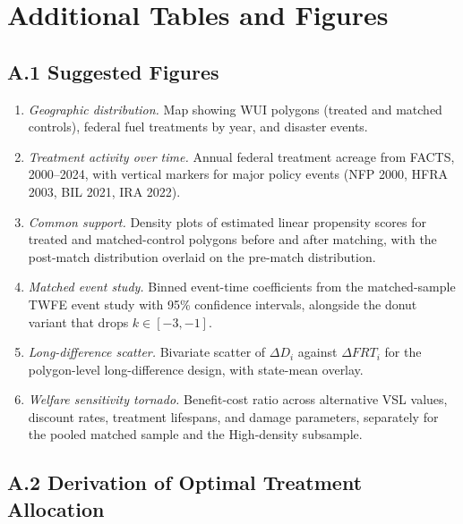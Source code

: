 \documentclass[12pt, letterpaper]{article}
\begin{document}
\newpage
\appendix
\doublespacing
\section{Additional Tables and Figures}\label{app:tables}

\subsection*{A.1 Suggested Figures}

\begin{enumerate}[leftmargin=*, itemsep=0.3em]
\item \textit{Geographic distribution.} Map showing WUI polygons (treated and matched controls), federal fuel treatments by year, and disaster events.
\item \textit{Treatment activity over time.} Annual federal treatment acreage from FACTS, 2000--2024, with vertical markers for major policy events (NFP 2000, HFRA 2003, BIL 2021, IRA 2022).
\item \textit{Common support.} Density plots of estimated linear propensity scores for treated and matched-control polygons before and after matching, with the post-match distribution overlaid on the pre-match distribution.
\item \textit{Matched event study.} Binned event-time coefficients from the matched-sample TWFE event study with 95\% confidence intervals, alongside the donut variant that drops $k \in [-3, -1]$.
\item \textit{Long-difference scatter.} Bivariate scatter of $\Delta D_i$ against $\Delta FRT_i$ for the polygon-level long-difference design, with state-mean overlay.
\item \textit{Welfare sensitivity tornado.} Benefit-cost ratio across alternative VSL values, discount rates, treatment lifespans, and damage parameters, separately for the pooled matched sample and the High-density subsample.
\end{enumerate}

\subsection*{A.2 Derivation of Optimal Treatment Allocation}
\end{document}
